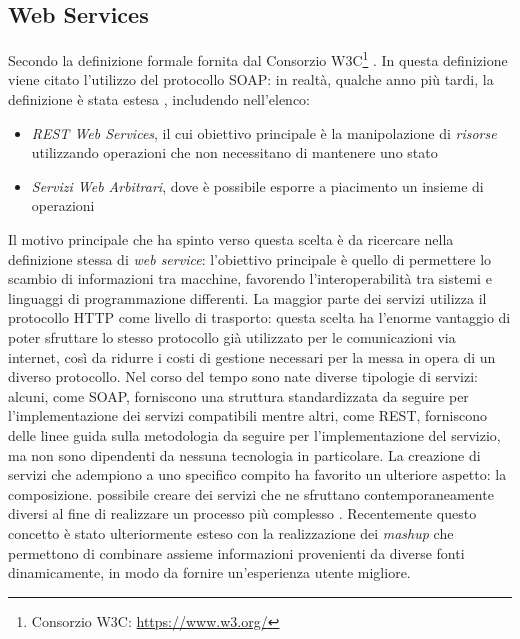 \subsection{Web Services\label{sec:web-services}}

Secondo la definizione formale fornita dal Consorzio W3C\footnote{Consorzio W3C: \url{https://www.w3.org/}}  \cite{world2004web}. In questa definizione viene citato l'utilizzo del protocollo SOAP: in realtà, qualche anno più tardi, la definizione è stata estesa \cite{w3c2004web}, includendo nell'elenco:

\begin{itemize}
	\item \emph{REST Web Services}, il cui obiettivo principale è la manipolazione di \emph{risorse} utilizzando operazioni che non necessitano di mantenere uno stato
	\item \emph{Servizi Web Arbitrari}, dove è possibile esporre a piacimento un insieme di operazioni
\end{itemize}

Il motivo principale che ha spinto verso questa scelta è da ricercare nella definizione stessa di \emph{web service}: l'obiettivo principale è quello di permettere lo scambio di informazioni tra macchine, favorendo l'interoperabilità tra sistemi e linguaggi di programmazione differenti. La maggior parte dei servizi utilizza il protocollo HTTP come livello di trasporto: questa scelta ha l'enorme vantaggio di poter sfruttare lo stesso protocollo già utilizzato per le comunicazioni via internet, così da ridurre i costi di gestione necessari per la messa in opera di un diverso protocollo. Nel corso del tempo sono nate diverse tipologie di servizi: alcuni, come SOAP, forniscono una struttura standardizzata da seguire per l'implementazione dei servizi compatibili mentre altri, come REST, forniscono delle linee guida sulla metodologia da seguire per l'implementazione del servizio, ma non sono dipendenti da nessuna tecnologia in particolare. La creazione di servizi che adempiono a uno specifico compito ha favorito un ulteriore aspetto: la composizione. \upe possibile creare dei servizi che ne sfruttano contemporaneamente diversi al fine di realizzare un processo più complesso \cite{weerawarana2005web}. Recentemente questo concetto è stato ulteriormente esteso con la realizzazione dei \emph{mashup} \cite{benslimane2008services} che permettono di combinare assieme informazioni provenienti da diverse fonti dinamicamente, in modo da fornire un'esperienza utente migliore.

